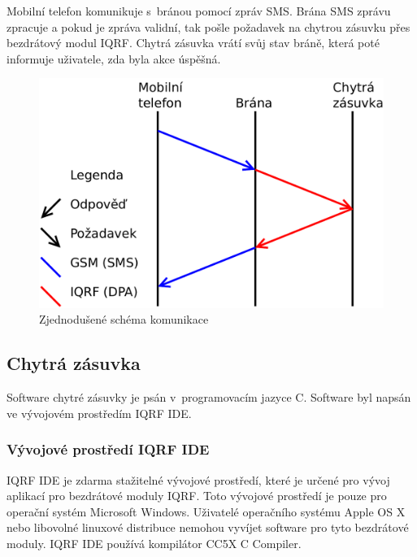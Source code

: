 \documentclass[12pt,a4paper,oneside]{article}
\begin{document}
Mobilní telefon komunikuje s~bránou pomocí zpráv SMS. Brána SMS zprávu zpracuje a pokud je zpráva validní, tak pošle požadavek na chytrou zásuvku přes bezdrátový modul IQRF. Chytrá zásuvka vrátí svůj stav bráně, která poté informuje uživatele, zda byla akce úspěšná.

\begin{figure}[H]
\centering
\label{fig:iqrf/zjednodusene-schema}
\includegraphics[width = 128mm]{../img/blokove-schema/komunikace0.pdf}
\caption{Zjednodušené schéma komunikace}
\end{figure}

\newpage

\subsection{Chytrá zásuvka}

Software chytré zásuvky je psán v~programovacím jazyce C. Software byl napsán ve vývojovém prostředím IQRF IDE\cite{iqrf/ide}.

\subsubsection{Vývojové prostředí IQRF IDE}

IQRF IDE\cite{iqrf/ide} je zdarma stažitelné vývojové prostředí, které je určené pro vývoj aplikací pro bezdrátové moduly IQRF. Toto vývojové prostředí je pouze pro operační systém Microsoft Windows. Uživatelé operačního systému Apple OS X nebo libovolné linuxové distribuce nemohou vyvíjet software pro tyto bezdrátové moduly. IQRF IDE používá kompilátor CC5X C Compiler\cite{cc5x-compiler}.
\end{document}
